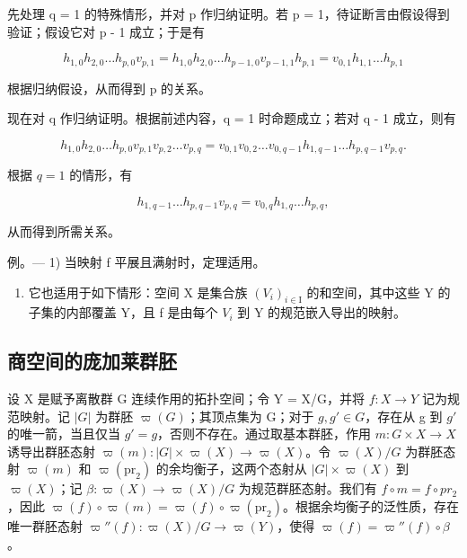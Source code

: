 先处理 q = 1 的特殊情形，并对 p 作归纳证明。若 p = 1，待证断言由假设得到验证；假设它对 p - 1 成立；于是有

\[
h _ {1, 0} h _ {2, 0} \dots h _ {p, 0} v _ {p, 1} = h _ {1, 0} h _ {2, 0} \dots h _ {p - 1, 0} v _ {p - 1, 1} h _ {p, 1} = v _ {0, 1} h _ {1, 1} \dots h _ {p, 1}
\]

根据归纳假设，从而得到 p 的关系。

现在对 q 作归纳证明。根据前述内容，q = 1 时命题成立；若对 q - 1 成立，则有

\[
h _ {1, 0} h _ {2, 0} \dots h _ {p, 0} v _ {p, 1} v _ {p, 2} \dots v _ {p, q} = v _ {0, 1} v _ {0, 2} \dots v _ {0, q - 1} h _ {1, q - 1} \dots h _ {p, q - 1} v _ {p, q}.
\]

根据 \(q = 1\) 的情形，有

\[
h _ {1, q - 1} \dots h _ {p, q - 1} v _ {p, q} = v _ {0, q} h _ {1, q} \dots h _ {p, q},
\]

从而得到所需关系。

例。--- 1) 当映射 f 平展且满射时，定理适用。

\begin{enumerate}
\def\labelenumi{\arabic{enumi})}
\setcounter{enumi}{1}
\tightlist
\item
  它也适用于如下情形：空间 X 是集合族 \((V_{i})_{i\in\mathrm{I}}\) 的和空间，其中这些 Y 的子集的内部覆盖 Y，且 f 是由每个 \(V_{i}\) 到 Y 的规范嵌入导出的映射。
\end{enumerate}

\subsection{商空间的庞加莱群胚}

设 X 是赋予离散群 G 连续作用的拓扑空间；令 Y = X/G，并将 \(f: X \to Y\) 记为规范映射。记 \(\lvert G\rvert\) 为群胚 \(\varpi(G)\)；其顶点集为 G；对于 \(g, g' \in G\)，存在从 g 到 \(g'\) 的唯一箭，当且仅当 \(g' = g\)，否则不存在。通过取基本群胚，作用 \(m: G \times X \to X\) 诱导出群胚态射 \(\varpi(m): \lvert G\rvert \times \varpi(X) \to \varpi(X)\)。令 \(\varpi(X)/G\) 为群胚态射 \(\varpi(m)\) 和 \(\varpi(\mathrm{pr}_{2})\) 的余均衡子，这两个态射从 \(\lvert G\rvert \times \varpi(X)\) 到 \(\varpi(X)\)；记 \(\beta: \varpi(X) \to \varpi(X)/G\) 为规范群胚态射。我们有 \(f \circ m = f \circ pr_{2}\)，因此 \(\varpi(f) \circ \varpi(m) = \varpi(f) \circ \varpi(\mathrm{pr}_{2})\)。根据余均衡子的泛性质，存在唯一群胚态射 \(\varpi''(f): \varpi(X)/G \to \varpi(Y)\)，使得 \(\varpi(f) = \varpi''(f) \circ \beta\)。

